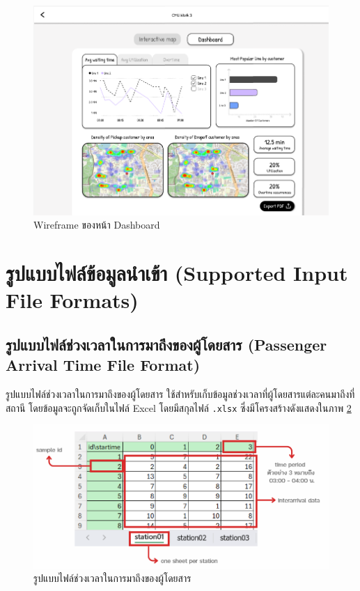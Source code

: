 \begin{mypara}
\begin{itemize}
      \begin{figure}[H]
        \centering
        \includegraphics[scale=0.4]{dashboard.png}
        \caption{Wireframe ของหน้า Dashboard }
        \label{fig:WireframeDashboardLogin}
      \end{figure}
    \end{itemize}

\end{mypara}

\section{รูปแบบไฟล์ข้อมูลนำเข้า (Supported Input File Formats)}
  \subsection{รูปแบบไฟล์ช่วงเวลาในการมาถึงของผู้โดยสาร (Passenger Arrival Time File Format)}
  \begin{mypara}
      \indent รูปแบบไฟล์ช่วงเวลาในการมาถึงของผู้โดยสาร ใช้สำหรับเก็บข้อมูลช่วงเวลาที่ผู้โดยสารแต่ละคนมาถึงที่สถานี
      โดยข้อมูลจะถูกจัดเก็บในไฟล์ Excel โดยมีสกุลไฟล์ \texttt{.xlsx} 
      ซึ่งมีโครงสร้างดังแสดงในภาพ \ref{fig:PassengerArrivalFileFormat}
      \begin{figure}[H]
        \centering
        \includegraphics[scale=0.5]{Passenger_Interarrival.png}
        \caption{รูปแบบไฟล์ช่วงเวลาในการมาถึงของผู้โดยสาร}
        \label{fig:PassengerArrivalFileFormat}
      \end{figure}
  \end{mypara}

